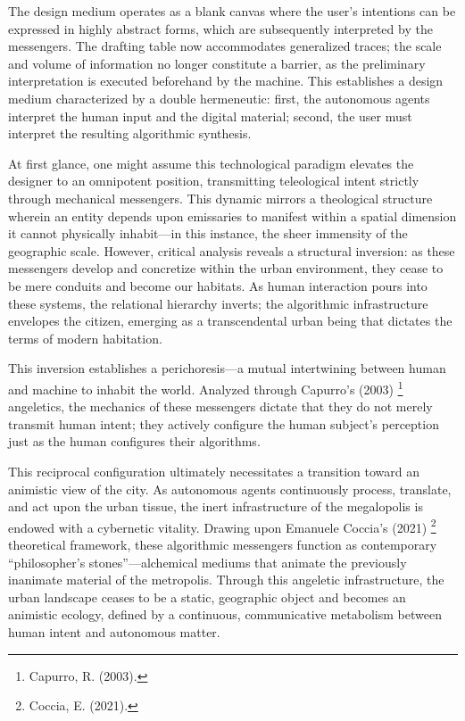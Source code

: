\documentclass[
  letterpaper,
  DIV=11,
  numbers=noendperiod]{scrreprt}
\begin{document}
The design medium operates as a blank canvas where the user's intentions
can be expressed in highly abstract forms, which are subsequently
interpreted by the messengers. The drafting table now accommodates
generalized traces; the scale and volume of information no longer
constitute a barrier, as the preliminary interpretation is executed
beforehand by the machine. This establishes a design medium
characterized by a double hermeneutic: first, the autonomous agents
interpret the human input and the digital material; second, the user
must interpret the resulting algorithmic synthesis.

At first glance, one might assume this technological paradigm elevates
the designer to an omnipotent position, transmitting teleological intent
strictly through mechanical messengers. This dynamic mirrors a
theological structure wherein an entity depends upon emissaries to
manifest within a spatial dimension it cannot physically inhabit---in
this instance, the sheer immensity of the geographic scale. However,
critical analysis reveals a structural inversion: as these messengers
develop and concretize within the urban environment, they cease to be
mere conduits and become our habitats. As human interaction pours into
these systems, the relational hierarchy inverts; the algorithmic
infrastructure envelopes the citizen, emerging as a transcendental urban
being that dictates the terms of modern habitation.

This inversion establishes a perichoresis---a mutual intertwining
between human and machine to inhabit the world. Analyzed through
Capurro's (2003) \footnote{Capurro, R. (2003).} angeletics, the
mechanics of these messengers dictate that they do not merely transmit
human intent; they actively configure the human subject's perception
just as the human configures their algorithms.

This reciprocal configuration ultimately necessitates a transition
toward an animistic view of the city. As autonomous agents continuously
process, translate, and act upon the urban tissue, the inert
infrastructure of the megalopolis is endowed with a cybernetic vitality.
Drawing upon Emanuele Coccia's (2021) \footnote{Coccia, E. (2021).}
theoretical framework, these algorithmic messengers function as
contemporary ``philosopher's stones''---alchemical mediums that animate
the previously inanimate material of the metropolis. Through this
angeletic infrastructure, the urban landscape ceases to be a static,
geographic object and becomes an animistic ecology, defined by a
continuous, communicative metabolism between human intent and autonomous
matter.
\end{document}
